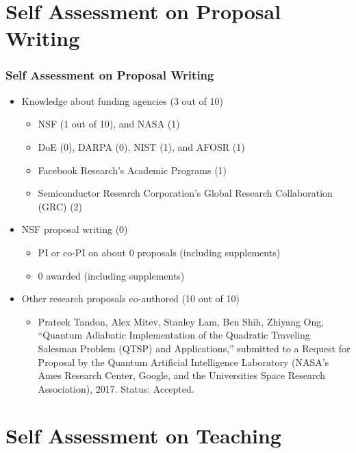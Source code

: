 \documentclass[xcolor={usenames,dvipsnames},hyperref={hyperindex,bookmarks}]{beamer}
\begin{document}
\section{Self Assessment on Proposal Writing}

\frame
{
	\frametitle{Self Assessment on Proposal Writing}
	{\footnotesize 
	\begin{itemize}
	\item Knowledge about funding agencies (3 out of 10) %
		\begin{itemize} %
		\item {\footnotesize NSF (1 out of 10), and NASA (1)}
		\item {\footnotesize DoE (0), DARPA (0), NIST (1), and AFOSR (1)}
		\item {\footnotesize Facebook Research's Academic Programs (1)}
		\item {\footnotesize Semiconductor Research Corporation's Global Research Collaboration (GRC) (2)}
		\end{itemize}
	\item NSF proposal writing (0) %
		\begin{itemize} %
		\item {\footnotesize PI or co-PI on about 0 proposals (including supplements)}
		\item {\footnotesize 0 awarded (including supplements)}
		\end{itemize}
	\item Other research proposals co-authored (10 out of 10)
		\begin{itemize} %
		\item {\footnotesize Prateek Tandon, Alex Mitev, Stanley Lam, Ben Shih, Zhiyang Ong, ``Quantum Adiabatic Implementation of the Quadratic Traveling Salesman Problem (QTSP) and Applications,'' submitted to a Request for Proposal by the Quantum Artificial Intelligence Laboratory (NASA's Ames Research Center, Google, and the Universities Space Research Association), 2017. Status: Accepted.}
		\end{itemize}
	\end{itemize}
	}
}




\section{Self Assessment on Teaching}
\end{document}
